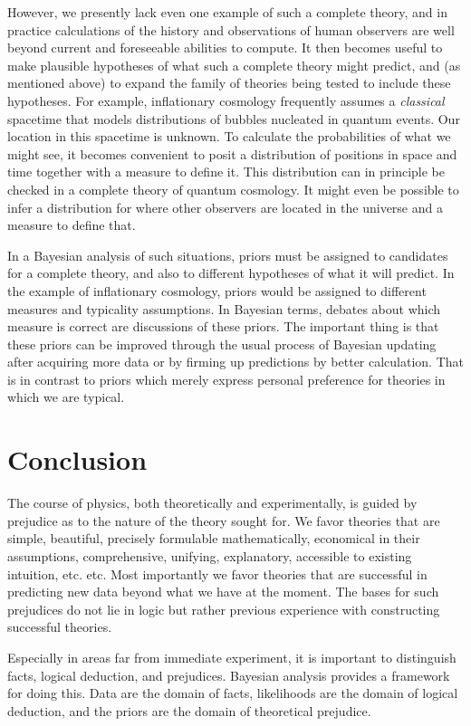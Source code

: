 \documentclass[pra,floatfix,preprint,nofootinbib,12pt]{revtex4}
\begin{document}
However, we presently lack even one example of such a complete theory, and in practice
calculations of the history and observations of human observers are well beyond current 
and foreseeable abilities to compute.  
It then becomes useful to make plausible hypotheses of what such a complete theory might predict, and (as  mentioned above) to expand the family of theories being tested to include these hypotheses.  For example, inflationary cosmology frequently assumes a {\it classical} spacetime that models distributions of bubbles nucleated in quantum events. Our location in this spacetime is unknown. To calculate the probabilities of what we might see, it becomes convenient to posit a distribution of positions in space and time together with  a measure to define it.  This distribution can in principle be checked in a complete theory of quantum cosmology. It might even be possible to infer a distribution for where other observers are located in the universe and a measure to define that. 

In a Bayesian analysis of such situations, priors must be assigned to candidates for a complete theory, and also to different hypotheses of what it will predict. 
In the example of inflationary cosmology, priors would be assigned to different measures and typicality assumptions. 
In Bayesian terms, debates about which measure is correct are discussions of these priors.
The important thing is that these priors can be improved through the usual process of Bayesian updating after acquiring more data or by  firming up predictions by better calculation. That is in contrast to priors which merely express personal preference for theories in which we are typical. 

\section{Conclusion}  The course of physics, both theoretically and experimentally, is guided by prejudice as to the nature of the theory sought for. We favor theories that are simple, beautiful, precisely formulable mathematically, economical in their assumptions, comprehensive, unifying, explanatory, accessible to existing intuition, etc. etc. Most importantly we favor theories that are successful in predicting new data beyond what we have at the moment. The bases for such prejudices do not lie in logic but rather previous experience with constructing successful theories. 

Especially in areas far from immediate experiment, it is important to distinguish facts,  logical deduction, and prejudices. Bayesian analysis provides a framework for doing this.  Data are the domain of facts, likelihoods are the domain of logical deduction, and the priors are the domain of theoretical prejudice. 
\end{document}
